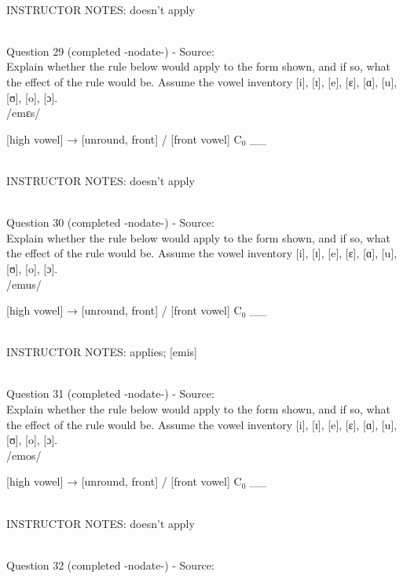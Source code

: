 \documentclass[12pt]{article}
\begin{document}
~\\
INSTRUCTOR NOTES: doesn't apply


~\\

{\large Question 29} (completed -nodate-) - Source: \\

Explain whether the rule below would apply to the form shown, and if so, what the effect of the rule would be. Assume the vowel inventory [i], [ɪ], [e], [ɛ], [ɑ], [u], [ʊ], [o], [ɔ].\\

/emɛs/

{[high vowel]} →  {[unround, front]} / {[front vowel]} C$_0$ \_\_ 


~\\
INSTRUCTOR NOTES: doesn't apply


~\\

{\large Question 30} (completed -nodate-) - Source: \\

Explain whether the rule below would apply to the form shown, and if so, what the effect of the rule would be. Assume the vowel inventory [i], [ɪ], [e], [ɛ], [ɑ], [u], [ʊ], [o], [ɔ].\\

/emus/

{[high vowel]} →  {[unround, front]} / {[front vowel]} C$_0$ \_\_ 


~\\
INSTRUCTOR NOTES: applies; [emis]


~\\

{\large Question 31} (completed -nodate-) - Source: \\

Explain whether the rule below would apply to the form shown, and if so, what the effect of the rule would be. Assume the vowel inventory [i], [ɪ], [e], [ɛ], [ɑ], [u], [ʊ], [o], [ɔ].\\

/emos/

{[high vowel]} →  {[unround, front]} / {[front vowel]} C$_0$ \_\_ 


~\\
INSTRUCTOR NOTES: doesn't apply


~\\

{\large Question 32} (completed -nodate-) - Source: \\
\end{document}
